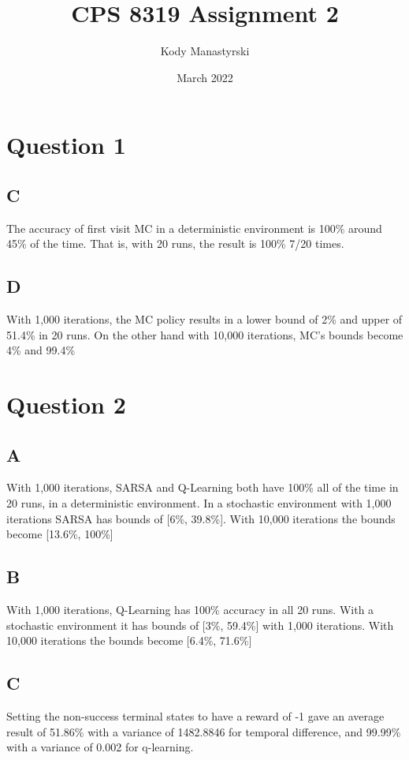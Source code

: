 \documentclass{article}
\title{CPS 8319 Assignment 2}
\date{ March 2022 }
\author{Kody Manastyrski}
\begin{document}
\maketitle

\section{Question 1}
\subsection{C}
The accuracy of first visit MC in a deterministic environment is 100\% around 45\% of the time.
That is, with 20 runs, the result is 100\% 7/20 times.

\subsection{D}
With 1,000 iterations, the MC policy results in a lower bound of 2\% and upper of 51.4\% in 20 runs.
On the other hand with 10,000 iterations, MC's bounds become 4\% and 99.4\%


\section{Question 2}
\subsection{A}
With 1,000 iterations, SARSA and Q-Learning both have 100\% all of the time in 20 runs, in a deterministic environment.
In a stochastic environment with 1,000 iterations SARSA has bounds of [6\%, 39.8\%].
With 10,000 iterations the bounds become [13.6\%, 100\%]

\subsection{B}
With 1,000 iterations, Q-Learning has 100\% accuracy in all 20 runs.
With a stochastic environment it has bounds of [3\%, 59.4\%] with 1,000 iterations.
With 10,000 iterations the bounds become [6.4\%, 71.6\%]

\subsection{C}
Setting the non-success terminal states to have a reward of -1 gave an average
result of 51.86\% with a variance of 1482.8846 for temporal difference, and 
99.99\% with a variance of 0.002 for q-learning.
\end{document}
